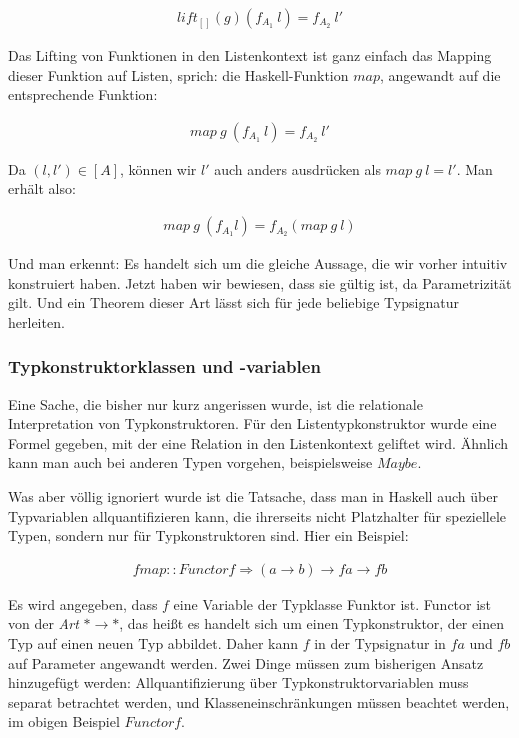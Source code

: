 \documentclass[11pt]{article} %
\begin{document}
\begin{align}
lift_{[]}(g) (f_{A_1}\ l) = f_{A_2}\ l'
\end{align}

Das Lifting von Funktionen in den Listenkontext ist ganz einfach das Mapping dieser Funktion auf Listen, sprich: die Haskell-Funktion
$map$, angewandt auf die entsprechende Funktion:

\begin{align}
map\ g\ (f_{A_1}\ l) = f_{A_2}\ l'
\end{align}

Da $(l, l') \in [A]$, können wir $l'$ auch anders ausdrücken als $map\ g\ l = l'$. Man erhält also:

\begin{align}
map\ g\ (f_{A_1} l) = f_{A_2} (map\ g\ l)
\end{align}

Und man erkennt: Es handelt sich um die gleiche Aussage, die wir vorher intuitiv konstruiert haben. Jetzt haben wir bewiesen,
dass sie gültig ist, da Parametrizität gilt. Und ein Theorem dieser Art lässt sich für jede beliebige Typsignatur herleiten.

\subsubsection{Typkonstruktorklassen und -variablen}

Eine Sache, die bisher nur kurz angerissen wurde, ist die relationale Interpretation von Typkonstruktoren. Für den Listentypkonstruktor
wurde eine Formel gegeben, mit der eine Relation in den Listenkontext geliftet wird. Ähnlich kann man auch bei anderen Typen
vorgehen, beispielsweise $Maybe$.

Was aber völlig ignoriert wurde ist die Tatsache, dass man in Haskell auch über Typvariablen allquantifizieren kann, die ihrerseits
nicht Platzhalter für speziellele Typen, sondern nur für Typkonstruktoren sind. Hier ein Beispiel:

\begin{align*}
fmap :: Functor f \Rightarrow (a \rightarrow b) \rightarrow f a \rightarrow f b
\end{align*}

Es wird angegeben, dass $f$ eine Variable der Typklasse Funktor ist. Functor ist von der \textit{Art} $* \rightarrow *$, das heißt es
handelt sich um einen Typkonstruktor, der einen Typ auf einen neuen Typ abbildet. Daher kann $f$ in der Typsignatur in $f a$
und $f b$ auf Parameter angewandt werden.
Zwei Dinge müssen zum bisherigen Ansatz hinzugefügt werden: Allquantifizierung über Typkonstruktorvariablen muss separat betrachtet werden, und Klasseneinschränkungen müssen beachtet werden, im obigen Beispiel $Functor f$.
\end{document}

